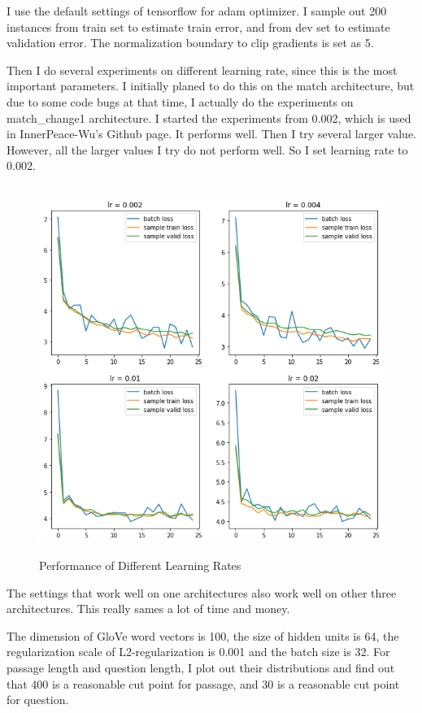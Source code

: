 \documentclass[modernstyle,12pt]{sjsuthesis}
\theoremstyle{definition}
\begin{document}
I use the default settings of tensorflow for adam optimizer. I sample out 200 instances from train set to estimate train error, and from dev set to estimate validation error. The normalization boundary to clip gradients is set as 5.

Then I do several experiments on different learning rate, since this is the most important parameters. I initially planed to do this on the match architecture, but due to some code bugs at that time, I actually do the experiments on match\_change1 architecture. I started the experiments from 0.002, which is used in InnerPeace-Wu's Github page. It performs well. Then I try several larger value. However, all the larger values I try do not perform well. So I set learning rate to 0.002.

\begin{figure}[htbp]\centering
  \includegraphics[width=12cm, height=12cm]{figures/lr.png}
  \caption{Performance of Different Learning Rates}
  \label{f:lr}
\end{figure}

The settings that work well on one architectures also work well on other three architectures. This really sames a lot of time and money.

The dimension of GloVe word vectors is 100, the size of hidden units is 64, the regularization scale of L2-regularization is 0.001 and the batch size is 32. For passage length and question length, I plot out their distributions and find out that 400 is a reasonable cut point for passage, and 30 is a reasonable cut point for question.
\end{document}
